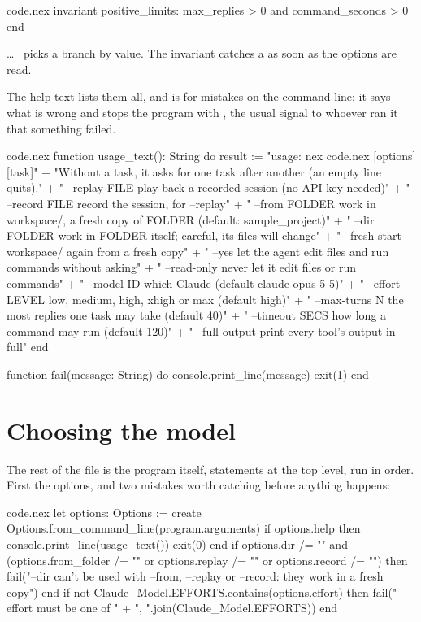 \begin{newfile}{code.nex}
invariant
  positive_limits: max_replies > 0 and command_seconds > 0
end
\end{newfile}

 \ldots\  picks a branch by value. The invariant catches
a  as soon as the options are read.

The help text lists them all, and  is for mistakes on the
command line: it says what is wrong and stops the program with
, the usual signal to whoever ran it that something failed.

\begin{continued}{code.nex}
function usage_text(): String do
  result := "usage: nex code.nex [options] [task]\n\n"
    + "Without a task, it asks for one task after another (an empty line quits).\n\n"
    + "  --replay FILE     play back a recorded session (no API key needed)\n"
    + "  --record FILE     record the session, for --replay\n"
    + "  --from FOLDER     work in workspace/, a fresh copy of FOLDER (default: sample_project)\n"
    + "  --dir FOLDER      work in FOLDER itself; careful, its files will change\n"
    + "  --fresh           start workspace/ again from a fresh copy\n"
    + "  --yes             let the agent edit files and run commands without asking\n"
    + "  --read-only       never let it edit files or run commands\n"
    + "  --model ID        which Claude (default claude-opus-5-5)\n"
    + "  --effort LEVEL    low, medium, high, xhigh or max (default high)\n"
    + "  --max-turns N     the most replies one task may take (default 40)\n"
    + "  --timeout SECS    how long a command may run (default 120)\n"
    + "  --full-output     print every tool's output in full\n"
end

function fail(message: String) do
  console.print_line(message)
  exit(1)
end
\end{continued}

\section{Choosing the model}

The rest of the file is the program itself, statements at the top level,
run in order. First the options, and two mistakes worth catching before
anything happens:

\begin{continued}{code.nex}
let options: Options := create Options.from_command_line(program.arguments)
if options.help then
  console.print_line(usage_text())
  exit(0)
end
if options.dir /= "" and (options.from_folder /= "" or options.replay /= "" or options.record /= "") then
  fail("--dir can't be used with --from, --replay or --record: they work in a fresh copy")
end
if not Claude_Model.EFFORTS.contains(options.effort) then
  fail("--effort must be one of " + ", ".join(Claude_Model.EFFORTS))
end
\end{continued}

